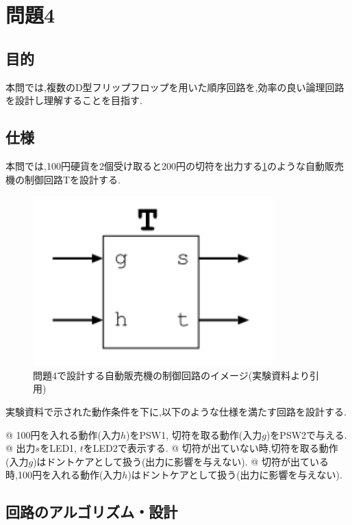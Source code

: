 \documentclass[autodetect-engine, dvi=dvipdfmx, 10pt, a4paper, ja=standard]{bxjsarticle}
\begin{document}
\section{問題4}

\subsection{目的}

本問では,複数のD型フリップフロップを用いた順序回路を,効率の良い論理回路を設計し理解することを目指す.

\subsection{仕様}

本問では,100円硬貨を2個受け取ると200円の切符を出力する\ref{fig:ex4-image}のような自動販売機の制御回路Tを設計する.

\begin{figure}[H]
	\centering
	\includegraphics[width=0.8\columnwidth]{asset/ex4_image.png}
	\caption{問題4で設計する自動販売機の制御回路のイメージ(実験資料より引用)}
	\label{fig:ex4-image}
\end{figure}

実験資料で示された動作条件を下に,以下のような仕様を満たす回路を設計する.

\begin{easylist}[enumerate]
	@ 100円を入れる動作(入力$h$)をPSW1, 切符を取る動作(入力$g$)をPSW2で与える.
	@ 出力$s$をLED1, $t$をLED2で表示する.
	@ 切符が出ていない時,切符を取る動作(入力$g$)はドントケアとして扱う(出力に影響を与えない).
	@ 切符が出ている時,100円を入れる動作(入力$h$)はドントケアとして扱う(出力に影響を与えない).
\end{easylist}


\subsection{回路のアルゴリズム・設計}
\end{document}
